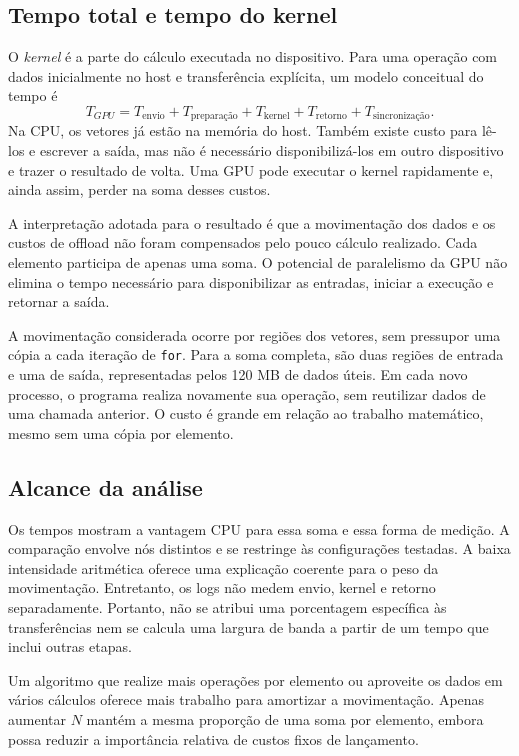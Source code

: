 \documentclass[12pt,a4paper]{article}
\begin{document}
\subsection{Tempo total e tempo do kernel}
O \textit{kernel} é a parte do cálculo executada no dispositivo. Para uma operação com dados inicialmente no host e transferência explícita, um modelo conceitual do tempo é
\[
T_{GPU}=T_{\text{envio}}+T_{\text{preparação}}+T_{\text{kernel}}+T_{\text{retorno}}+T_{\text{sincronização}}.
\]
Na CPU, os vetores já estão na memória do host. Também existe custo para lê-los e escrever a saída, mas não é necessário disponibilizá-los em outro dispositivo e trazer o resultado de volta. Uma GPU pode executar o kernel rapidamente e, ainda assim, perder na soma desses custos.



A interpretação adotada para o resultado é que a movimentação dos dados e os custos de offload não foram compensados pelo pouco cálculo realizado. Cada elemento participa de apenas uma soma. O potencial de paralelismo da GPU não elimina o tempo necessário para disponibilizar as entradas, iniciar a execução e retornar a saída.

A movimentação considerada ocorre por regiões dos vetores, sem pressupor uma cópia a cada iteração de \texttt{for}. Para a soma completa, são duas regiões de entrada e uma de saída, representadas pelos 120 MB de dados úteis. Em cada novo processo, o programa realiza novamente sua operação, sem reutilizar dados de uma chamada anterior. O custo é grande em relação ao trabalho matemático, mesmo sem uma cópia por elemento.

\subsection{Alcance da análise}
Os tempos mostram a vantagem CPU para essa soma e essa forma de medição. A comparação envolve nós distintos e se restringe às configurações testadas. A baixa intensidade aritmética oferece uma explicação coerente para o peso da movimentação. Entretanto, os logs não medem envio, kernel e retorno separadamente. Portanto, não se atribui uma porcentagem específica às transferências nem se calcula uma largura de banda a partir de um tempo que inclui outras etapas.

Um algoritmo que realize mais operações por elemento ou aproveite os dados em vários cálculos oferece mais trabalho para amortizar a movimentação. Apenas aumentar $N$ mantém a mesma proporção de uma soma por elemento, embora possa reduzir a importância relativa de custos fixos de lançamento.
\end{document}
